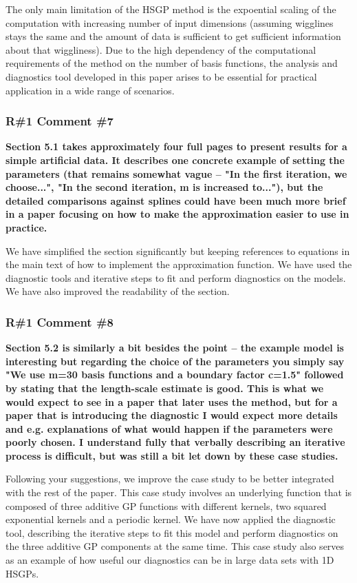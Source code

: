 \documentclass[11pt]{report}
\begin{document}
The only main limitation of the HSGP method is the expoential scaling of the computation with increasing number of input dimensions (assuming wigglines stays the same and the amount of data is sufficient to get sufficient information about that wiggliness). 
Due to the high dependency of the computational requirements of the method on the number of basis functions, the analysis and diagnostics tool developed in this paper arises to be essential for practical application in a wide range of scenarios. 

\subsubsection*{R\#1 Comment \#7}

\textbf{Section 5.1 takes approximately four full pages to present results for a simple artificial data. It describes one concrete example of setting the parameters (that remains somewhat vague -- "In the first iteration, we choose...", "In the second iteration, m is increased to..."), but the detailed comparisons against splines could have been much more brief in a paper focusing on how to make the approximation easier to use in practice.}

We have simplified the section significantly but keeping references to equations in the main text of how to implement the approximation function. We have used the diagnostic tools and iterative steps to fit and perform diagnostics on the models. We have also improved the readability of the section.

\subsubsection*{R\#1 Comment \#8}

\textbf{Section 5.2 is similarly a bit besides the point -- the example model is interesting but regarding the choice of the parameters you simply say "We use m=30 basis functions and a boundary factor c=1.5" followed by stating that the length-scale estimate is good. This is what we would expect to see in a paper that later uses the method, but for a paper that is introducing the diagnostic I would expect more details and e.g. explanations of what would happen if the parameters were poorly chosen. I understand fully that verbally describing an iterative process is difficult, but was still a bit let down by these case studies.}

Following your suggestions, we improve the case study to be better integrated with the rest of the paper. This case study involves an underlying function that is composed of three additive GP functions with different kernels, two squared exponential kernels and a periodic kernel. We have now applied the diagnostic tool, describing the iterative steps to fit this model and perform diagnostics on the three additive GP components at the same time. This case study also serves as an example of how useful our diagnostics can be in large data sets with 1D HSGPs.
\end{document}
